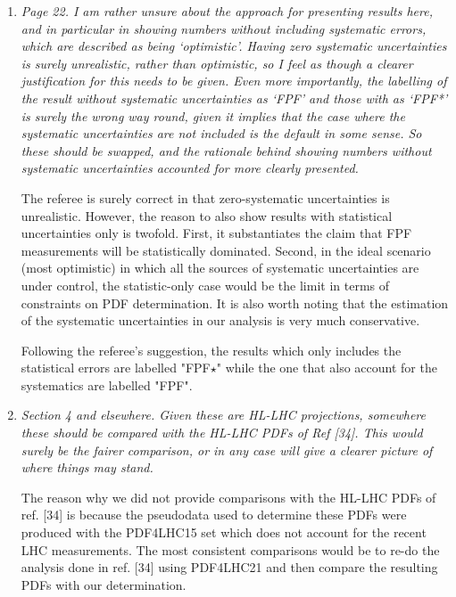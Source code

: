 \documentclass[11pt,a4paper]{article}
\begin{document}
\begin{enumerate}
	\item {\it Page 22. I am rather unsure about the approach for presenting results here, and in
		particular in showing numbers without including systematic errors, which are described
		as being ‘optimistic’. Having zero systematic uncertainties is surely unrealistic, rather
		than optimistic, so I feel as though a clearer justification for this needs to be given.
		Even more importantly, the labelling of the result without systematic uncertainties as
		‘FPF’ and those with as ‘FPF*’ is surely the wrong way round, given it implies that
		the case where the systematic uncertainties are not included is the default in some
		sense. So these should be swapped, and the rationale behind showing numbers without
		systematic uncertainties accounted for more clearly presented.
	}
	
	The referee is surely correct in that zero-systematic uncertainties is unrealistic. However,
	the reason to also show results with statistical uncertainties only is twofold. First, it
	substantiates the claim that FPF measurements will be statistically dominated. Second, in the
	ideal scenario (most optimistic) in which all the sources of systematic uncertainties are 
	under control, the statistic-only case would be the limit in terms of constraints on PDF
	determination.  It is also worth noting that the estimation of the systematic uncertainties in our 
	analysis is very  much conservative.
	
	Following the referee's suggestion, the results which only includes the statistical errors
	are labelled "FPF$\star$" while the one that also account for the systematics are labelled "FPF".
	
	\item {\it Section 4 and elsewhere. Given these are HL-LHC projections, somewhere these should
		be compared with the HL-LHC PDFs of Ref [34]. This would surely be the fairer
		comparison, or in any case will give a clearer picture of where things may stand.
	}
	
	The reason why we did not provide comparisons with the HL-LHC PDFs of ref. [34] is because
	the pseudodata used to determine these PDFs were produced with the PDF4LHC15 set which
	does not account for the recent LHC measurements. The most consistent comparisons would
	be to re-do the analysis done in ref. [34] using PDF4LHC21 and then compare the resulting PDFs 
	with our determination.

\end{enumerate}
\end{document}
